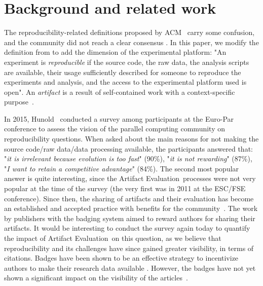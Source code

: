 \documentclass[sigconf,natbib=false]{acmart}
\newcommand{\aeval}{Artifact Evaluation}
\begin{document}
%
\section{Background and related work}\label{sec:background}

The reproducibility-related definitions proposed by ACM\ \cite{acm-badges} carry some confusion, and the community did not reach a clear consensus \cite{plesser2018reproducibility, barba2018terminologies}.
In this paper, we modify the definition from \cite{rougier2019rescience} to add the dimension of the experimental platform:
"An experiment is \emph{reproducible} if the source code, the raw data, the analysis scripts are available, their usage sufficiently described for someone to reproduce the experiments and analysis, and the access to the experimental platform used is open".
An \emph{artifact} is a result of self-contained work with a context-specific purpose\ \cite{mendez2019artefacts}.

In 2015, Hunold\ \cite{hunold2015survey} conducted a survey among participants at the Euro-Par conference to assess the vision of the parallel computing community on reproducibility questions. 
When asked about the main reasons for not making the source code/raw data/data processing available, the participants answered that: "\emph{it is irrelevant because evolution is too fast}" (90\%), "\emph{it is not rewarding}" (87\%), "\emph{I want to retain a competitive advantage}" (84\%).
The second most popular answer is quite interesting, since the \aeval\ processes were not very popular at the time of the survey (the very first was in 2011 at the ESC/FSE conference).
Since then, the sharing of artifacts and their evaluation has become an established and accepted practice with benefits for the community\ \cite{hermann2022has}.
The work by publishers with the badging system aimed to reward authors for sharing their artifacts.
It would be interesting to conduct the survey again today to quantify the impact of \aeval\ on this question, as we believe that reproducibility and its challenges have since gained greater visibility, in terms of citations.
Badges have been shown to be an effective strategy to incentivize authors to make their research data available \cite{kidwell2016badges, rowhani2017incentives}.
However, the badges have not yet shown a significant impact on the visibility of the articles\ \cite{winter2022retrospective, frachtenberg2022research, heumuller2020publish}. 
\end{document}
